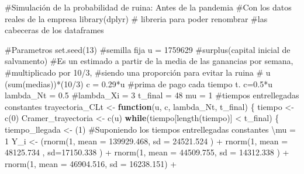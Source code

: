 \documentclass[
  us-letterpaper,
]{scrreprt}
\newenvironment{Shaded}{\begin{snugshade}}{\end{snugshade}}
\newcommand{\AttributeTok}[1]{\textcolor[rgb]{0.40,0.45,0.13}{#1}}
\newcommand{\CommentTok}[1]{\textcolor[rgb]{0.37,0.37,0.37}{#1}}
\newcommand{\ControlFlowTok}[1]{\textcolor[rgb]{0.00,0.23,0.31}{\textbf{#1}}}
\newcommand{\DecValTok}[1]{\textcolor[rgb]{0.68,0.00,0.00}{#1}}
\newcommand{\FloatTok}[1]{\textcolor[rgb]{0.68,0.00,0.00}{#1}}
\newcommand{\FunctionTok}[1]{\textcolor[rgb]{0.28,0.35,0.67}{#1}}
\newcommand{\NormalTok}[1]{\textcolor[rgb]{0.00,0.23,0.31}{#1}}
\newcommand{\OtherTok}[1]{\textcolor[rgb]{0.00,0.23,0.31}{#1}}
\newcommand{\SpecialCharTok}[1]{\textcolor[rgb]{0.37,0.37,0.37}{#1}}
\theoremstyle{definition}
\theoremstyle{plain}
\theoremstyle{plain}
\theoremstyle{remark}
\begin{document}
\begin{Shaded}
\begin{Highlighting}[]
\CommentTok{\#Simulación de la probabilidad de ruina: Antes de la pandemia}
\CommentTok{\#Con los datos reales de la empresa}
\FunctionTok{library}\NormalTok{(dplyr) }\CommentTok{\# libreria para poder renombrar }
\CommentTok{\#las cabeceras de los dataframes}

\CommentTok{\#Parametros}
\FunctionTok{set.seed}\NormalTok{(}\DecValTok{13}\NormalTok{) }\CommentTok{\#semilla fija}
\NormalTok{u }\OtherTok{=} \DecValTok{1759629} \CommentTok{\#surplus(capital inicial de salvamento)}
\CommentTok{\#Es un estimado a partir de la media de las ganancias por semana, }
\CommentTok{\#multiplicado por 10/3, }
\CommentTok{\#siendo una proporción para evitar la ruina}
\CommentTok{\# u (sum(medias))*(10/3)}
\NormalTok{c }\OtherTok{=} \FloatTok{0.29}\SpecialCharTok{*}\NormalTok{u }\CommentTok{\#prima de pago cada tiempo t. c=0.5*u}
\NormalTok{lambda\_Nt }\OtherTok{=} \FloatTok{0.5}
\CommentTok{\#lambda\_Xi = 3}
\NormalTok{t\_final }\OtherTok{=} \DecValTok{48}
\NormalTok{mu }\OtherTok{=} \DecValTok{1} \CommentTok{\#tiempos entrellegadas constantes}
\NormalTok{trayectoria\_CLt }\OtherTok{\textless{}{-}} \ControlFlowTok{function}\NormalTok{(u, c, lambda\_Nt, t\_final)}
\NormalTok{\{}
\NormalTok{  tiempo }\OtherTok{\textless{}{-}} \FunctionTok{c}\NormalTok{(}\DecValTok{0}\NormalTok{)}
\NormalTok{  Cramer\_trayectoria }\OtherTok{\textless{}{-}} \FunctionTok{c}\NormalTok{(u)}
  \ControlFlowTok{while}\NormalTok{(tiempo[}\FunctionTok{length}\NormalTok{(tiempo)] }\SpecialCharTok{\textless{}}\NormalTok{ t\_final)}
\NormalTok{  \{}
\NormalTok{    tiempo\_llegada }\OtherTok{\textless{}{-}}\NormalTok{ (}\DecValTok{1}\NormalTok{) }
\CommentTok{\#Suponiendo los tiempos entrellegadas constantes \textbackslash{}mu = 1}
\NormalTok{    Y\_i }\OtherTok{\textless{}{-}}\NormalTok{  (}\FunctionTok{rnorm}\NormalTok{(}\DecValTok{1}\NormalTok{, }\AttributeTok{mean =} \FloatTok{139929.468}\NormalTok{, }\AttributeTok{sd =} \FloatTok{24521.524}\NormalTok{ ) }\SpecialCharTok{+}
             \FunctionTok{rnorm}\NormalTok{(}\DecValTok{1}\NormalTok{, }\AttributeTok{mean =} \FloatTok{48125.734}\NormalTok{ , }\AttributeTok{sd=}\FloatTok{17150.338}\NormalTok{ )   }\SpecialCharTok{+}  
             \FunctionTok{rnorm}\NormalTok{(}\DecValTok{1}\NormalTok{, }\AttributeTok{mean =}  \FloatTok{44509.755}\NormalTok{, }\AttributeTok{sd =} \FloatTok{14312.338}\NormalTok{ ) }\SpecialCharTok{+} 
             \FunctionTok{rnorm}\NormalTok{(}\DecValTok{1}\NormalTok{, }\AttributeTok{mean =}   \FloatTok{46904.516}\NormalTok{, }\AttributeTok{sd =} \FloatTok{16238.151}\NormalTok{) }\SpecialCharTok{+} 

\end{Highlighting}
\end{Shaded}
\end{document}
